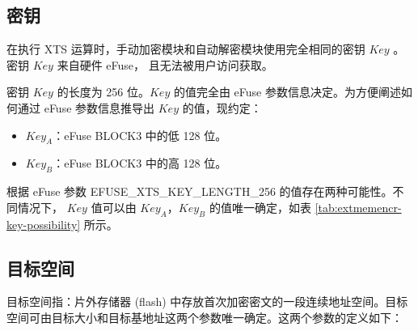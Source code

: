 \documentclass[main\_\_CN.tex]{subfiles}
\begin{document}
\subsection{密钥}
\label{sec:extmemncr-key}

在执行 XTS 运算时，手动加密模块和自动解密模块使用完全相同的密钥 \begin{math}Key\end{math} 。密钥 \begin{math}Key\end{math}  来自硬件 eFuse， 且无法被用户访问获取。

密钥 \begin{math}Key\end{math} 的长度为 256 位。\begin{math}Key\end{math} 的值完全由 eFuse 参数信息决定。为方便阐述如何通过 eFuse 参数信息推导出  \begin{math}Key\end{math} 的值，现约定：
\begin{itemize}
    \item \begin{math}Key_{A}\end{math}：eFuse BLOCK3 中的低 128 位。
    \item \begin{math}Key_{B}\end{math}：eFuse BLOCK3 中的高 128 位。
\end{itemize}

根据 eFuse 参数 EFUSE\_XTS\_KEY\_LENGTH\_256 的值存在两种可能性。不同情况下， \begin{math}Key\end{math} 值可以由 \begin{math}Key_{A}\end{math}，\begin{math}Key_{B}\end{math} 的值唯一确定，如表 \ref{tab:extmemencr-key-possibility} 所示。



\subsection{目标空间}
\label{sec:extmemencr-target-space}

目标空间指：片外存储器 (flash) 中存放首次加密密文的一段连续地址空间。目标空间可由目标大小和目标基地址这两个参数唯一确定。这两个参数的定义如下：
\end{document}
